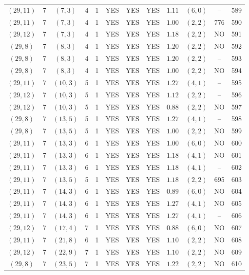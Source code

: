 \begin{longtable}{|c|c|c|c|c|c|c|c|c|c|c|c|}
$(29,11)$ & 7 & $(7,3)$ & 4 & 1 & YES & YES & YES & $1.11$ & $(6,0)$ & -- & 589\\
$(29,11)$ & 7 & $(7,3)$ & 4 & 1 & YES & YES & YES & $1.00$ & $(2,2)$ & 776 & 590\\
$(29,12)$ & 7 & $(7,3)$ & 4 & 1 & YES & YES & YES & $1.18$ & $(2,2)$ & NO & 591\\
$(29,8)$ & 7 & $(8,3)$ & 4 & 1 & YES & YES & YES & $1.20$ & $(2,2)$ & NO & 592\\
$(29,8)$ & 7 & $(8,3)$ & 4 & 1 & YES & YES & YES & $1.20$ & $(2,2)$ & -- & 593\\
$(29,8)$ & 7 & $(8,3)$ & 4 & 1 & YES & YES & YES & $1.00$ & $(2,2)$ & NO & 594\\
$(29,11)$ & 7 & $(10,3)$ & 5 & 1 & YES & YES & YES & $1.27$ & $(4,1)$ & -- & 595\\
$(29,12)$ & 7 & $(10,3)$ & 5 & 1 & YES & YES & YES & $1.12$ & $(2,2)$ & -- & 596\\
$(29,12)$ & 7 & $(10,3)$ & 5 & 1 & YES & YES & YES & $0.88$ & $(2,2)$ & NO & 597\\
$(29,8)$ & 7 & $(13,5)$ & 5 & 1 & YES & YES & YES & $1.27$ & $(4,1)$ & -- & 598\\
$(29,8)$ & 7 & $(13,5)$ & 5 & 1 & YES & YES & YES & $1.00$ & $(2,2)$ & NO & 599\\
$(29,11)$ & 7 & $(13,3)$ & 6 & 1 & YES & YES & YES & $1.00$ & $(6,0)$ & NO & 600\\
$(29,11)$ & 7 & $(13,3)$ & 6 & 1 & YES & YES & YES & $1.18$ & $(4,1)$ & NO & 601\\
$(29,11)$ & 7 & $(13,3)$ & 6 & 1 & YES & YES & YES & $1.18$ & $(4,1)$ & -- & 602\\
$(29,11)$ & 7 & $(13,5)$ & 5 & 1 & YES & YES & YES & $1.18$ & $(2,2)$ & 695 & 603\\
$(29,11)$ & 7 & $(14,3)$ & 6 & 1 & YES & YES & YES & $0.89$ & $(6,0)$ & NO & 604\\
$(29,11)$ & 7 & $(14,3)$ & 6 & 1 & YES & YES & YES & $1.27$ & $(4,1)$ & NO & 605\\
$(29,11)$ & 7 & $(14,3)$ & 6 & 1 & YES & YES & YES & $1.27$ & $(4,1)$ & -- & 606\\
$(29,12)$ & 7 & $(17,4)$ & 7 & 1 & YES & YES & YES & $0.88$ & $(6,0)$ & NO & 607\\
$(29,11)$ & 7 & $(21,8)$ & 6 & 1 & YES & YES & YES & $1.10$ & $(2,2)$ & NO & 608\\
$(29,12)$ & 7 & $(22,9)$ & 7 & 1 & YES & YES & YES & $1.10$ & $(2,2)$ & NO & 609\\
$(29,8)$ & 7 & $(23,5)$ & 7 & 1 & YES & YES & YES & $1.22$ & $(2,2)$ & NO & 610\\

\end{longtable}
